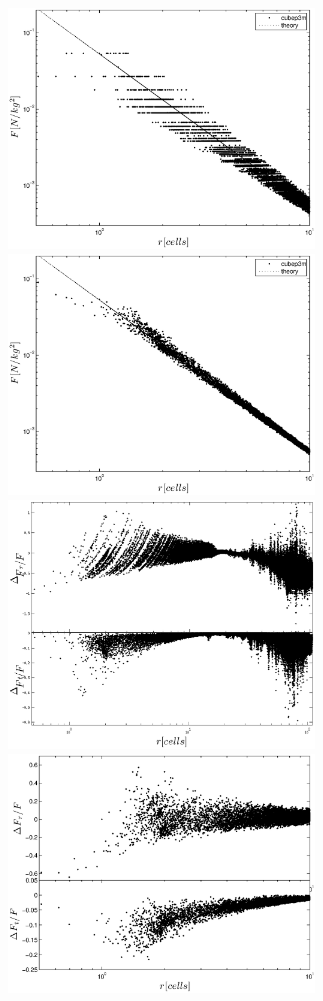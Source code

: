 \begin{figure}%
  \begin{center}
     \includegraphics[width=3.2in]{graphs/densityForce_Zoom_N1.eps}
    \includegraphics[width=3.2in]{graphs/densityForce_Zoom_N10.eps}
   \includegraphics[width=3.2in]{graphs/densityForce_fracErr_N1.eps}
    \includegraphics[width=3.2in]{graphs/densityForce_fracErr_N10.eps}

\end{center}
\end{figure}
